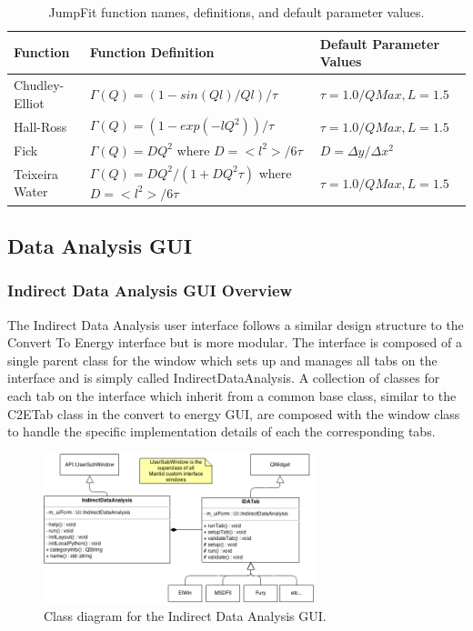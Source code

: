 \documentclass[paper=a4, fontsize=11pt]{scrartcl}	%
\numberwithin{equation}{section}															%
\numberwithin{figure}{section}																%
\numberwithin{table}{section}																%
\begin{document}
\begin{table}[H]
\begin{center}
\begin{tabular}{ l l l}
Function & Function Definition & Default Parameter Values \\ \hline
Chudley-Elliot &  $\Gamma(Q) = (1 - sin(Ql)/Ql)/\tau$ & $\tau = 1.0/QMax, L=1.5$\\ \hline
Hall-Ross & $\Gamma(Q) = (1-exp(-lQ^2))/\tau$ & $\tau = 1.0/QMax, L=1.5$ \\ \hline
Fick & \parbox{6cm}{$\Gamma(Q) = DQ^2$ \\ where $D=<l^2>/6\tau$} & $D = \Delta y / \Delta x^2$\\ \hline
Teixeira Water & \parbox{6cm}{$\Gamma(Q) = DQ^2/(1 + DQ^2\tau)$ \\ where $D=<l^2>/6\tau$} & $\tau = 1.0/QMax, L=1.5$ \\ \hline
\end{tabular}
\caption{JumpFit function names, definitions, and default parameter values.}
\label{table:jumpfit-functions}
\end{center}
\end{table}

\subsection{Data Analysis GUI}

\subsubsection{Indirect Data Analysis GUI Overview}
\label{subsubsec:IDA-GUI-Overview}
The Indirect Data Analysis user interface follows a similar design structure to the Convert To Energy interface but is more modular. The interface is composed of a single parent class for the window which sets up and manages all tabs on the interface and is simply called IndirectDataAnalysis. A collection of classes for each tab on the interface which inherit from a common base class, similar to the C2ETab class in the convert to energy GUI, are composed with the window class to handle the specific implementation details of each the corresponding tabs.

\begin{figure}[H]
\centering
\includegraphics[width=0.7\textwidth]{img/uml/class_diagrams/IDA_structure.png}
\caption{Class diagram for the Indirect Data Analysis GUI.}
\label{fig:IDA-class-diagram}
\end{figure}
\end{document}
